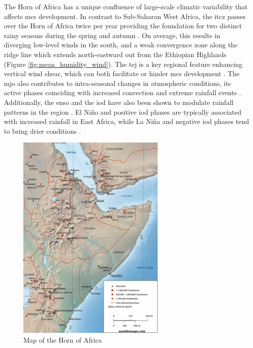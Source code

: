The Horn of Africa has a unique confluence of large-scale climatic variability that affects \acrshort{mcs} development. In contrast to Sub-Saharan West Africa, the \acrfull{itcz} passes over the Horn of Africa twice per year providing the foundation for two distinct rainy seasons during the spring and autumn \citep{Palmer2023,Tefera2025}. On average, this results in diverging low-level winds in the south, and a weak convergence zone along the ridge line which extends north-eastward out from the Ethiopian Highlands (Figure \ref{fig:mean_humidity_wind}). The \acrfull{tej} is a key regional feature enhancing vertical wind shear, which can both facilitate or hinder \acrshort{mcs} development \citep{Farnsworth2011,Vashisht2021}. The \acrfull{mjo} also contributes to intra-seasonal changes in atmospheric conditions, its active phases coinciding with increased convection and extreme rainfall events \citep{Camberlin2019,Ochieng2023,Pohl2006}. Additionally, the \acrfull{enso} and the \acrfull{iod} have also been shown to modulate rainfall patterns in the region \citep{Dubache2019,Endris2019,Vashisht2021,Zaroug2014}. El Niño and positive \acrshort{iod} phases are typically associated with increased rainfall in East Africa, while La Niña and negative \acrshort{iod} phases tend to bring drier conditions \citep{Camberlin2019,Endris2019}.

\begin{figure}[ht]
    \centering
    \includegraphics[width=0.65\textwidth]{../figures/static/horn-of-africa-map-scaled.jpeg}
    \caption{Map of the Horn of Africa \citep{WorldInMaps2024}}
    \label{fig:horn-of-africa}
\end{figure}

